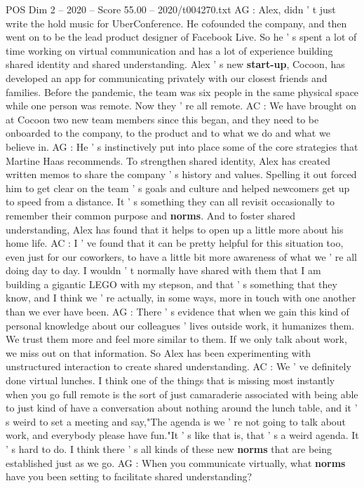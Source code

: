 \begin{textsample}{POS Dim 2 – 2020 – Score 55.00 – 2020/t004270.txt}
AG : Alex, didn ' t just write the hold music for UberConference.
He cofounded the company, and then went on to be the lead product designer of Facebook Live.
So he ' s spent a lot of time working on virtual communication and has a lot of experience building shared identity and shared understanding.
Alex ' s new \textbf{start-up}, Cocoon, has developed an app for communicating privately with our closest friends and families.
Before the pandemic, the team was six people in the same physical space while one person was remote.
Now they ' re all remote.
AC : We have brought on at Cocoon two new team members since this began, and they need to be onboarded to the company, to the product and to what we do and what we believe in.
AG : He ' s instinctively put into place some of the core strategies that Martine Haas recommends.
To strengthen shared identity, Alex has created written memos to share the company ' s history and values.
Spelling it out forced him to get clear on the team ' s goals and culture and helped newcomers get up to speed from a distance.
It ' s something they can all revisit occasionally to remember their common purpose and \textbf{norms}.
And to foster shared understanding, Alex has found that it helps to open up a little more about his home life.
AC : I ' ve found that it can be pretty helpful for this situation too, even just for our coworkers, to have a little bit more awareness of what we ' re all doing day to day.
I wouldn ' t normally have shared with them that I am building a gigantic LEGO with my stepson, and that ' s something that they know, and I think we ' re actually, in some ways, more in touch with one another than we ever have been.
AG : There ' s evidence that when we gain this kind of personal knowledge about our colleagues ' lives outside work, it humanizes them.
We trust them more and feel more similar to them.
If we only talk about work, we miss out on that information.
So Alex has been experimenting with unstructured interaction to create shared understanding.
AC : We ' ve definitely done virtual lunches.
I think one of the things that is missing most instantly when you go full remote is the sort of just camaraderie associated with being able to just kind of have a conversation about nothing around the lunch table, and it ' s weird to set a meeting and say,"The agenda is we ' re not going to talk about work, and everybody please have fun."It ' s like that is, that ' s a weird agenda.
It ' s hard to do.
I think there ' s all kinds of these new \textbf{norms} that are being established just as we go.
AG : When you communicate virtually, what \textbf{norms} have you been setting to facilitate shared understanding?

\end{textsample}
